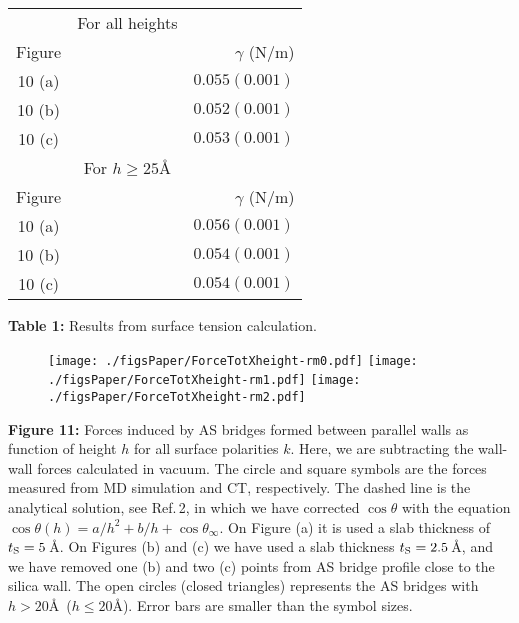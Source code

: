 \documentclass[a0,portrait,16pt]{a0poster}
\begin{document}
{{\begin{center}
		\begin{tabular}{ccr}
		\hline
		\hline
		& For all heights & \\
		Figure      &  &       $\gamma$ (N/m)  \\
		\hline          
		10 (a)  &         &       $ 0.055	(0.001)$        \\
		10 (b)  &         &       $ 0.052	(0.001)$        \\
		10 (c)  &         &       $ 0.053	(0.001)$        \\

		& For $h\geq 25$\AA & \\
		Figure      &  &       $\gamma$ (N/m)  \\		
		\hline		
		10 (a)  &         &       $ 0.056	(0.001)$        \\
		10 (b)  &         &       $ 0.054  (0.001)$        \\ 
		10 (c)  &         &       $ 0.054  (0.001)$        \\ 		
		\hline		
		\hline		
		\end{tabular}
\end{center}
\small{\textbf{Table 1: } Results from surface tension calculation. }


\begin{figure}
	\centerline{
		\texttt{[image: ./figsPaper/ForceTotXheight-rm0.pdf]}		
		\texttt{[image: ./figsPaper/ForceTotXheight-rm1.pdf]}
		\texttt{[image: ./figsPaper/ForceTotXheight-rm2.pdf]}		
	}
\end{figure}
\small{\textbf{Figure 11:} Forces induced by AS bridges formed between parallel walls as function of height $h$ for all surface polarities $k$. Here, we are subtracting the wall-wall forces calculated in vacuum. The circle and square symbols are the forces measured from MD simulation and CT, respectively. The dashed line is the analytical solution, see Ref.\,2, in which we have corrected $\cos\theta$ with the equation $\cos\theta(h)= a/h^2 + b/h +  \cos\theta_{\infty}$.
On Figure (a) it is used a slab thickness of $t_{\rm S} = 5$\,\AA.	
On Figures (b) and (c) we have used a slab thickness $t_{\rm S} = 2.5$\,\AA, and we have removed one (b) and two (c) points from AS bridge profile close to the silica wall. The open circles (closed triangles) represents the AS bridges with $h > 20$\AA ~($h \leq 20$\AA).
Error bars are smaller than the symbol sizes.
}



}}
\end{document}
